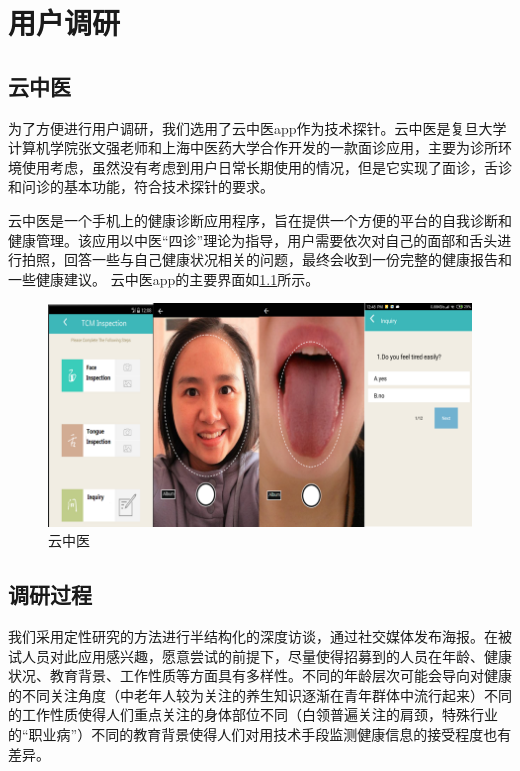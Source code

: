 \chapter{用户调研}

\section{云中医}
为了方便进行用户调研，我们选用了云中医app作为技术探针。云中医是复旦大学计算机学院张文强老师和上海中医药大学合作开发的一款面诊应用，主要为诊所环境使用考虑，虽然没有考虑到用户日常长期使用的情况，但是它实现了面诊，舌诊和问诊的基本功能，符合技术探针的要求。

云中医是一个手机上的健康诊断应用程序，旨在提供一个方便的平台的自我诊断和健康管理。该应用以中医“四诊”理论为指导，用户需要依次对自己的面部和舌头进行拍照，回答一些与自己健康状况相关的问题，最终会收到一份完整的健康报告和一些健康建议。
云中医app的主要界面如\ref{fig:main}所示。

\begin{figure}
    \centering
    \includegraphics{images/main.png}
    \caption{云中医}
    \label{fig:main}
\end{figure}

\section{调研过程}
 
我们采用定性研究的方法进行半结构化的深度访谈，通过社交媒体发布海报。在被试人员对此应用感兴趣，愿意尝试的前提下，尽量使得招募到的人员在年龄、健康状况、教育背景、工作性质等方面具有多样性。不同的年龄层次可能会导向对健康的不同关注角度（中老年人较为关注的养生知识逐渐在青年群体中流行起来）不同的工作性质使得人们重点关注的身体部位不同（白领普遍关注的肩颈，特殊行业的“职业病”）不同的教育背景使得人们对用技术手段监测健康信息的接受程度也有差异。

